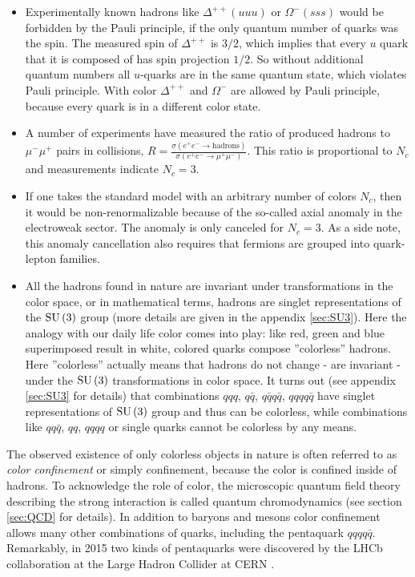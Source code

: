 \begin{itemize}
\item Experimentally known hadrons like $\Delta^{++}(uuu)$ or $\Omega^-(sss)$
      would be forbidden by the Pauli principle, if the only quantum number of
      quarks was the spin. The measured spin of $\Delta^{++}$ is $3/2$, which implies
      that every $u$ quark that it is composed of has spin projection $1/2$. So
      without additional quantum numbers all $u$-quarks are in the same quantum
      state, which violates Pauli principle. With color $\Delta^{++}$ and $\Omega^-$
      are allowed by Pauli principle, because every quark is in a different color
      state.
\item A number of experiments have measured the ratio of produced hadrons
      to $\mu^-\mu^+$ pairs in \Pelectron\Ppositron collisions,
      $R = \frac{\sigma(e^+e^- \to \mathrm{hadrons})}{\sigma(e^+e^- \to \mu^+\mu^-)}$.
      This ratio is proportional to $N_c$ and measurements indicate $N_c = 3$.
\item If one takes the standard model with an arbitrary number of colors $N_c$,
      then it would be non-renormalizable because of the so-called axial anomaly in
      the electroweak sector. The anomaly is only canceled for $N_c = 3$. As a side
      note, this anomaly cancellation also requires that fermions are grouped into
      quark-lepton families.
\item All the hadrons found in nature are invariant under
      transformations in the color space, or in mathematical terms,
      hadrons are singlet representations of the $\mathrm{SU}\left({3}\right)$ group (more details are
      given in the appendix \ref{sec:SU3}). Here the
      analogy with our daily life color comes into play: like red, green and blue
      superimposed result in white, colored quarks compose ''colorless'' hadrons. Here
      ''colorless'' actually means that hadrons do not change - are invariant - under
      the $\mathrm{SU}\left({3}\right)$ transformations in color space. It turns out (see appendix
      \ref{sec:SU3} for details) that combinations $qqq$, $q\bar{q}$,
      $q\bar{q}q\bar{q}$, $qqqq\bar{q}$ have singlet representations of $\mathrm{SU}\left({3}\right)$
      group and thus can be colorless, while combinations like $qq\bar{q}$, $qq$,
      $qqqq$ or single quarks cannot be colorless by any means.
\end{itemize}

The observed existence of only colorless objects in nature is often referred to as
\emph{color confinement} or simply confinement, because the color is confined inside
of hadrons.  To acknowledge the role of color, the microscopic quantum field theory
describing the strong interaction is called quantum chromodynamics (see section
\ref{sec:QCD} for details). In addition to baryons and
mesons color confinement allows many other combinations of quarks, including the
pentaquark $qqqq\bar{q}$. Remarkably, in 2015 two kinds of pentaquarks were
discovered by the LHCb collaboration at the Large Hadron Collider at CERN
\cite{Aaij:2015tga}.

